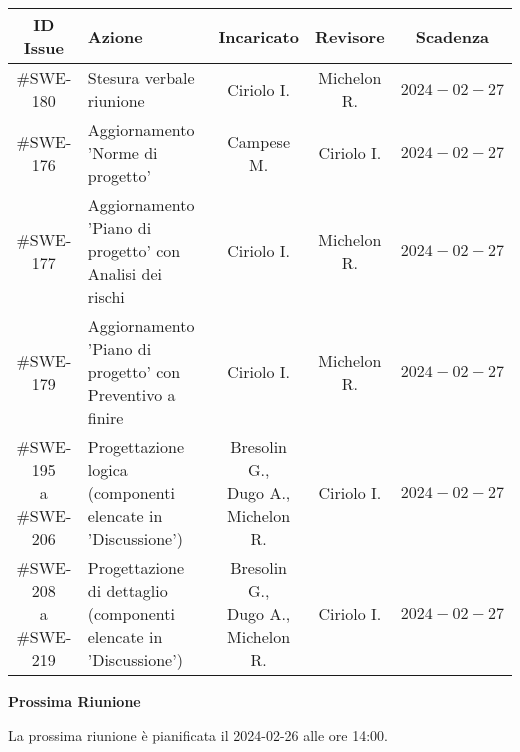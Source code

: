 \documentclass[10pt, a4paper]{article}
\begin{document}
{\renewcommand{\arraystretch}{1.5}
\begin{tabularx}{\textwidth}{c|X|c|c|c}
\textbf{ID Issue} & \textbf{Azione} & \textbf{Incaricato} & \textbf{Revisore} & \textbf{Scadenza} \\
\hline
\#SWE-180 &
Stesura verbale riunione &
Ciriolo I. &
Michelon R. &
$2024-02-27$ \\
\hline
\#SWE-176 &
Aggiornamento 'Norme di progetto' &
Campese M. &
Ciriolo I. &
$2024-02-27$ \\
\hline
\#SWE-177 &
Aggiornamento 'Piano di progetto' con Analisi dei rischi &
Ciriolo I. &
Michelon R. &
$2024-02-27$ \\
\hline
\#SWE-179 &
Aggiornamento 'Piano di progetto' con Preventivo a finire &
Ciriolo I. &
Michelon R. &
$2024-02-27$ \\
\hline
\quantities{\#SWE-195 \\a \#SWE-206} & Progettazione logica (componenti elencate in 'Discussione')& \quantities{ Bresolin G., \\ Dugo A., \\ Michelon R. } & Ciriolo I. & $2024-02-27$ \\
\hline
\quantities{\#SWE-208 \\a \#SWE-219} & Progettazione di dettaglio (componenti elencate in 'Discussione')& \quantities{ Bresolin G., \\ Dugo A., \\ Michelon R. } & Ciriolo I. & $2024-02-27$ \\
\end{tabularx}}

\vspace{3em}


\textbf{Prossima Riunione}

La prossima riunione è pianificata il 2024-02-26 alle ore 14:00.
\end{document}
